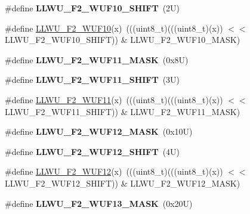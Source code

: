 \begin{DoxyCompactItemize}
\#define {\bfseries L\+L\+W\+U\+\_\+\+F2\+\_\+\+W\+U\+F10\+\_\+\+S\+H\+I\+FT}~(2\+U)
\item 
\#define \mbox{\hyperlink{group___l_l_w_u___register___masks_ga1fbe79331ec3d400d836f9bb7de533a6}{L\+L\+W\+U\+\_\+\+F2\+\_\+\+W\+U\+F10}}(x)~(((uint8\+\_\+t)(((uint8\+\_\+t)(x)) $<$$<$ L\+L\+W\+U\+\_\+\+F2\+\_\+\+W\+U\+F10\+\_\+\+S\+H\+I\+FT)) \& L\+L\+W\+U\+\_\+\+F2\+\_\+\+W\+U\+F10\+\_\+\+M\+A\+SK)
\item 
\mbox{\label{group___l_l_w_u___register___masks_ga618834480f34a7997f2f4fab80d87400}} 
\#define {\bfseries L\+L\+W\+U\+\_\+\+F2\+\_\+\+W\+U\+F11\+\_\+\+M\+A\+SK}~(0x8\+U)
\item 
\mbox{\label{group___l_l_w_u___register___masks_ga37c17efe2e5332ad92f9a05d9a15a2f2}} 
\#define {\bfseries L\+L\+W\+U\+\_\+\+F2\+\_\+\+W\+U\+F11\+\_\+\+S\+H\+I\+FT}~(3\+U)
\item 
\#define \mbox{\hyperlink{group___l_l_w_u___register___masks_ga8cff952a35e87f71a4b24ef6feefee82}{L\+L\+W\+U\+\_\+\+F2\+\_\+\+W\+U\+F11}}(x)~(((uint8\+\_\+t)(((uint8\+\_\+t)(x)) $<$$<$ L\+L\+W\+U\+\_\+\+F2\+\_\+\+W\+U\+F11\+\_\+\+S\+H\+I\+FT)) \& L\+L\+W\+U\+\_\+\+F2\+\_\+\+W\+U\+F11\+\_\+\+M\+A\+SK)
\item 
\mbox{\label{group___l_l_w_u___register___masks_ga59dfa340c96f0c04fe3667e00dfb0575}} 
\#define {\bfseries L\+L\+W\+U\+\_\+\+F2\+\_\+\+W\+U\+F12\+\_\+\+M\+A\+SK}~(0x10\+U)
\item 
\mbox{\label{group___l_l_w_u___register___masks_gae04234ed612320f80fe119820ae78e39}} 
\#define {\bfseries L\+L\+W\+U\+\_\+\+F2\+\_\+\+W\+U\+F12\+\_\+\+S\+H\+I\+FT}~(4\+U)
\item 
\#define \mbox{\hyperlink{group___l_l_w_u___register___masks_ga4b8f9110dc4fbd5597c179a2b819b946}{L\+L\+W\+U\+\_\+\+F2\+\_\+\+W\+U\+F12}}(x)~(((uint8\+\_\+t)(((uint8\+\_\+t)(x)) $<$$<$ L\+L\+W\+U\+\_\+\+F2\+\_\+\+W\+U\+F12\+\_\+\+S\+H\+I\+FT)) \& L\+L\+W\+U\+\_\+\+F2\+\_\+\+W\+U\+F12\+\_\+\+M\+A\+SK)
\item 
\mbox{\label{group___l_l_w_u___register___masks_ga6618b24b83e2e28d9268c1f5fac431af}} 
\#define {\bfseries L\+L\+W\+U\+\_\+\+F2\+\_\+\+W\+U\+F13\+\_\+\+M\+A\+SK}~(0x20\+U)
$$
\end{DoxyCompactItemize}
